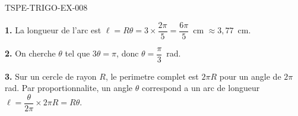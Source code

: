 \begin{corrige}{TSPE-TRIGO-EX-008}

\textbf{1.} La longueur de l'arc est $\ell = R\theta = 3 \times \dfrac{2\pi}{5} = \dfrac{6\pi}{5}$~cm $\approx 3{,}77$~cm.

\textbf{2.} On cherche $\theta$ tel que $3\theta = \pi$, donc $\theta = \dfrac{\pi}{3}$~rad.

\textbf{3.} Sur un cercle de rayon $R$, le perimetre complet est $2\pi R$ pour un angle de $2\pi$ rad. Par proportionnalite, un angle $\theta$ correspond a un arc de longueur $\ell = \dfrac{\theta}{2\pi} \times 2\pi R = R\theta$.

\end{corrige}
